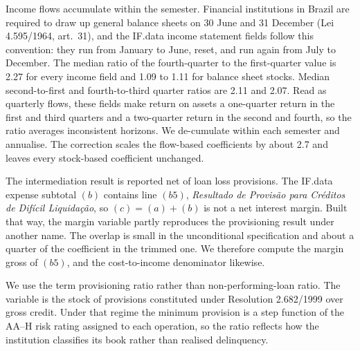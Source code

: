 \documentclass[11pt,a4paper]{article}
\begin{document}
Income flows accumulate within the semester. Financial institutions in Brazil are
required to draw up general balance sheets on 30 June and 31 December (Lei 4.595/1964,
art.~31), and the IF.data income statement fields follow this convention: they run from
January to June, reset, and run again from July to December. The median ratio of the
fourth-quarter to the first-quarter value is 2.27 for every income field and 1.09 to 1.11
for balance sheet stocks. Median second-to-first and fourth-to-third quarter ratios are
2.11 and 2.07. Read as quarterly flows, these fields make return on assets a one-quarter
return in the first and third quarters and a two-quarter return in the second and fourth,
so the ratio averages inconsistent horizons. We de-cumulate within each semester and
annualise. The correction scales the flow-based coefficients by about 2.7 and leaves
every stock-based coefficient unchanged.

The intermediation result is reported net of loan loss provisions. The IF.data expense
subtotal $(b)$ contains line $(b5)$, \textit{Resultado de Provis\~ao para Cr\'editos de
Dif\'icil Liquida\c{c}\~ao}, so $(c) = (a) + (b)$ is not a net interest margin. Built
that way, the margin variable partly reproduces the provisioning result under another
name. The overlap is small in the unconditional specification and about a quarter of the
coefficient in the trimmed one. We therefore compute the margin gross of $(b5)$, and the
cost-to-income denominator likewise.

We use the term provisioning ratio rather than non-performing-loan ratio. The variable is
the stock of provisions constituted under Resolution 2.682/1999 over gross credit. Under
that regime the minimum provision is a step function of the AA--H risk rating assigned to
each operation, so the ratio reflects how the institution classifies its book rather than
realised delinquency.
\end{document}
